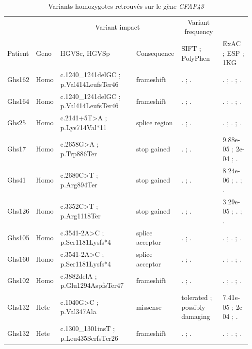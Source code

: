 \documentclass[12pt,a4paper,twoside]{ugathesis}
\theoremstyle{definition}
\theoremstyle{definition}
\theoremstyle{definition}
\theoremstyle{remark}
\begin{document}
\begin{landscape}
\begin{longtable}[t]{llllll}
\caption{\label{tab:tabcfap43}Variants homozygotes retrouvés sur le gène \textit{CFAP43}}\\
\toprule
\multicolumn{2}{c}{ } & \multicolumn{2}{c}{Variant impact} & \multicolumn{1}{c}{Variant frequency} \\
\cmidrule(l{2pt}r{2pt}){3-4} \cmidrule(l{2pt}r{2pt}){5-5}
Patient & Geno & HGVSc, HGVSp & Consequence & SIFT ; PolyPhen & ExAC ; ESP ; 1KG\\
\midrule
Ghs162 & Homo & c.1240\_1241delGC ; p.Val414LeufsTer46 & frameshift & . ; . & . ; . ; .\\
Ghs164 & Homo & c.1240\_1241delGC ; p.Val414LeufsTer46 & frameshift & . ; . & . ; . ; .\\
Ghs25 & Homo & c.2141+5T>A ; p.Lys714Val*11 & splice region & . ; . & . ; . ; .\\
Ghs17 & Homo & c.2658G>A ; p.Trp886Ter & stop gained & . ; . & 9.88e-05 ; 2e-04 ; .\\
Ghs41 & Homo & c.2680C>T ; p.Arg894Ter & stop gained & . ; . & 8.24e-06 ; . ; .\\
\addlinespace
Ghs126 & Homo & c.3352C>T ; p.Arg1118Ter & stop gained & . ; . & 3.29e-05 ; . ; .\\
Ghs105 & Homo & c.3541-2A>C ; p.Ser1181Lysfs*4 & splice acceptor & . ; . & . ; . ; .\\
Ghs160 & Homo & c.3541-2A>C ; p.Ser1181Lysfs*4 & splice acceptor & . ; . & . ; . ; .\\
Ghs102 & Homo & c.3882delA ; p.Glu1294AspfsTer47 & frameshift & . ; . & . ; . ; .\\
Ghs132 & Hete & c.1040G>C ; p.Val347Ala & missense & tolerated ; possibly damaging & 7.41e-05 ; 2e-04 ; .\\
Ghs132 & Hete & c.1300\_1301insT ; p.Leu435SerfsTer26 & frameshift & . ; . & . ; . ; .\\
\bottomrule
\end{longtable}
\end{landscape}

\newpage
\end{document}
